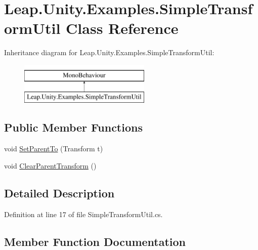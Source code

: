 \hypertarget{class_leap_1_1_unity_1_1_examples_1_1_simple_transform_util}{}\section{Leap.\+Unity.\+Examples.\+Simple\+Transform\+Util Class Reference}
\label{class_leap_1_1_unity_1_1_examples_1_1_simple_transform_util}
Inheritance diagram for Leap.\+Unity.\+Examples.\+Simple\+Transform\+Util\+:\begin{figure}[H]
\begin{center}
\leavevmode
\includegraphics[height=2.000000cm]{class_leap_1_1_unity_1_1_examples_1_1_simple_transform_util}
\end{center}
\end{figure}
\subsection*{Public Member Functions}
\begin{DoxyCompactItemize}
\item 
void \mbox{\hyperlink{class_leap_1_1_unity_1_1_examples_1_1_simple_transform_util_af7050fcf910fa82dae60d06ddb8133bb}{Set\+Parent\+To}} (Transform t)
\item 
void \mbox{\hyperlink{class_leap_1_1_unity_1_1_examples_1_1_simple_transform_util_a70ab7ff5b3c6cfff62a7b7edc05f1001}{Clear\+Parent\+Transform}} ()
\end{DoxyCompactItemize}


\subsection{Detailed Description}


Definition at line 17 of file Simple\+Transform\+Util.\+cs.



\subsection{Member Function Documentation}
\mbox{\label{class_leap_1_1_unity_1_1_examples_1_1_simple_transform_util_a70ab7ff5b3c6cfff62a7b7edc05f1001}} 
